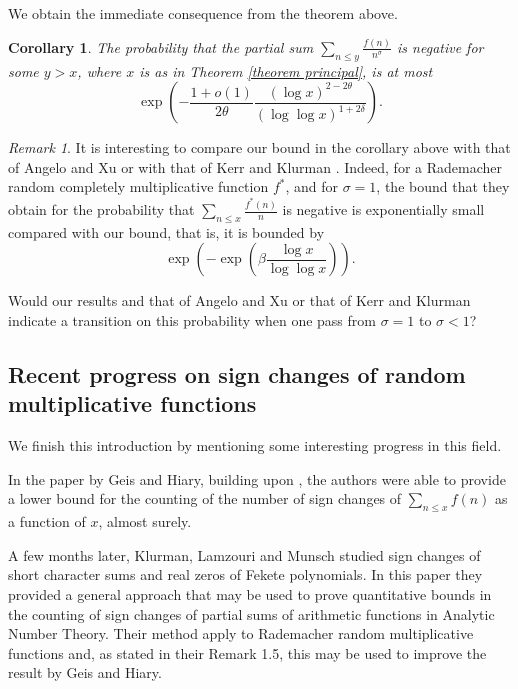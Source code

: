 \documentclass[reqno0,12pt]{amsart}
\newtheorem{corollary}{Corollary}[section]
\theoremstyle{remark}
\newtheorem{remark}{Remark}[section]
\begin{document}
We obtain the immediate consequence from the theorem above.

\begin{corollary} The probability that the partial sum $\sum_{n\leq y}\frac{f(n)}{n^\sigma}$ is negative for some $y>x$, where $x$ is as in Theorem \ref{theorem principal}, is at most
$$\exp\left(-\frac{1+o(1)}{2\theta}\frac{(\log x)^{2-2\theta}}{(\log\log x)^{1+2\delta}}\right).$$
\end{corollary}

\begin{remark}\label{remark} It is interesting to compare our bound in the corollary above with that of Angelo and Xu \cite{angelo_xu_positivity} or with that of Kerr and Klurman \cite{klurman_positivity}. Indeed, for a Rademacher random completely multiplicative function $f^{*}$, and for $\sigma=1$, the bound that they obtain for the probability that $\sum_{n\leq x}\frac{f^*(n)}{n}$ is negative is exponentially small compared with our bound, that is, it is bounded by
$$\exp\left(-\exp\left(\beta \frac{\log x}{\log\log x}\right)\right).$$

Would our results and that of Angelo and Xu or that of Kerr and Klurman indicate a transition on this probability when one pass from $\sigma=1$ to $\sigma<1$?
\end{remark}

\subsection{Recent progress on sign changes of random multiplicative functions} We finish this introduction by mentioning some interesting progress in this field. 

In the paper \cite{geis_counting_sign_changes} by Geis and Hiary, building upon \cite{aymone_sign_changes}, the authors were able to provide a lower bound for the counting of the number of sign changes of $\sum_{n\leq x}f(n)$ as a function of $x$, almost surely. 

A few months later, Klurman, Lamzouri and Munsch \cite{klurman_counting_sign_changes} studied sign changes of short character sums and real zeros of Fekete polynomials. In this paper they provided a general approach that may be used to prove quantitative bounds in the counting of sign changes of partial sums of arithmetic functions in Analytic Number Theory. Their method apply to Rademacher random multiplicative functions and, as stated in their Remark 1.5, this may be used to improve the result by Geis and Hiary.
 
\end{document}
